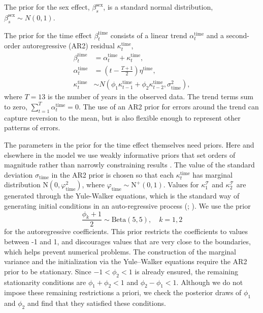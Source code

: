 \documentclass{article}
\begin{document}
The prior for the sex effect, $\beta_s^{\text{sex}}$, is a standard normal distribution, $\beta_s^{\text{sex}}\sim N(0,1)$.

The prior for the time effect $\beta_t^{\text{time}}$ consists of a linear trend $\alpha_t^{\text{time}}$ and a second-order autoregressive (AR2) residual  $\kappa_t^{\text{time}}$,
\begin{equation}
\begin{aligned}
\beta_t^{\text{time}}&=\alpha_t^{\text{time}}+\kappa_t^{\text{time}},\\
\alpha_t^{\text{time}}&=\left(t-\frac{T+1}{2}\right) \eta^{\text{time}},\\
\kappa_t^{\text{time}}&\sim N(\phi_1\kappa_{t-1}^{\text{time}}+\phi_2\kappa_{t-2}^{\text{time}},\sigma_{\text{time}}^2),
\end{aligned}
\end{equation}
where $T=13$ is the number of years in the observed data. The trend terms sum to zero, $\sum_{t=1}^T\alpha_t^{\text{time}}=0$. The use of an AR2 prior for errors around the trend can capture reversion to the mean, but is also flexible enough to represent other patterns of errors. 

The parameters in the prior for the time effect themselves need priors. {\color{yellow}Here and elsewhere in the model we use weakly informative priors that set orders of magnitude rather than narrowly constraining results \citep[p. 55]{Gelman2014bayesian}.} The value of the standard deviation $\sigma_{\text{time}}$ in the AR2 prior is chosen so that each $\kappa_t^{\text{time}}$ has marginal distribution $\text{N}(0, \varphi_{\text{time}}^2)$, where 
$\varphi_{\text{time}} \sim \text{N}^+(0,1)$. Values for $\kappa_1^{\mathcal{T}}$ and $\kappa_2^{\mathcal{T}}$ are generated through the Yule-Walker equations, which is the standard way of generating initial conditions in an auto-regressive process (\citealp[pp.~45--46]{prado2021time}; \citealp{tmb2025ar}). We use the prior
\begin{equation}
  \frac{\phi_k + 1}{2} \sim \text{Beta}(5, 5), \quad k = 1, 2
\end{equation}
for the autoregressive coefficients. This prior restricts the coefficients to values between -1 and 1, and discourages values that are very close to the boundaries, which helps prevent numerical problems. {\color{magenta}The construction of the marginal variance and the initialization via the Yule–Walker equations require the AR2 prior to be stationary. Since $-1<\phi_2<1$ is already ensured, the remaining stationarity conditions are $\phi_1+\phi_2<1$ and $\phi_2-\phi_1<1$. Although we do not impose these remaining restrictions a priori, we check the posterior draws of $\phi_1$ and $\phi_2$ and find that they satisfied these conditions.}
\end{document}
